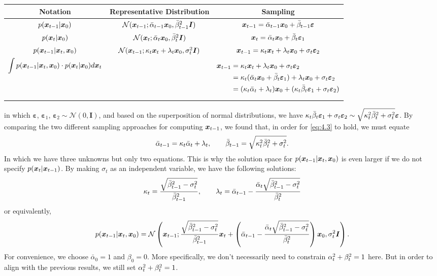 \begin{table*}[h]
    \centering
    \begin{tabular}{c|c|c}
    \hline
      Notation    & Representative Distribution &  Sampling\\
    \hline
     $p(\bm{x}_{t-1}|\bm{x}_0)$  &  $\mathcal{N}(\bm{x}_{t-1};\bar{\alpha}_{t-1}\bm{x}_0,\bar{\beta}_{t-1}^2\bm{I})$ & $\bm{x}_{t-1}=\bar{\alpha}_{t-1} \bm{x}_0+\bar{\beta}_{t-1} \bm{\varepsilon}$ \\
     \hline
     $p(\bm{x}_{t}|\bm{x}_0)$  & $\mathcal{N}(\bm{x}_{t};\bar{\alpha}_t\bm{x}_0,\bar{\beta}_t^2\bm{I})$  & $\bm{x}_{t}=\bar{\alpha}_t\bm{x}_0+\bar{\beta}_t\bm{\varepsilon}_1$\\
     \hline
     $p(\bm{x}_{t-1}|\bm{x}_{t},\bm{x}_0)$ &  $\mathcal{N}(\bm{x}_{t-1};\kappa_t\bm{x}_{t}+\lambda_t \bm{x}_0,\sigma_t^2\bm{I})$ & $\bm{x}_{t-1}=\kappa_t\bm{x}_{t}+\lambda_t\bm{x}_0+\sigma_t\bm{\varepsilon}_2$ \\
     \hline
     $\displaystyle{\int p(\bm{x}_{t-1}|\bm{x}_{t},\bm{x}_0)}\cdot p(\bm{x}_{t}|\bm{x}_0)d\bm{x}_{t} $ &   &   \parbox{6cm}{\begin{align*}
    \bm{x}_{t-1} &= \kappa_t\bm{x}_{t} +\lambda_t\bm{x}_0+\sigma_t\bm{\varepsilon}_2\\
     &= \kappa_t (\bar{\alpha}_t\bm{x}_0 +\bar{\beta}_t\bm{\varepsilon}_1) + \lambda_t\bm{x}_0+\sigma_t\bm{\varepsilon}_2\\
     &= (\kappa_t\bar{\alpha}_t+\lambda_t)\bm{x}_0+(\kappa_t\bar{\beta}_t\bm{\varepsilon}_1+\sigma_t\bm{\varepsilon}_2)
  \end{align*}} \\
    \hline
    \end{tabular}
\end{table*}
in which $\bm{\varepsilon}$, $\bm{\varepsilon}_1$, $\bm{\varepsilon}_2\sim\mathcal{N}(0,\bm{I})$, and based on the superposition of normal distributions, we have $\kappa_t\bar{\beta}_t\bm{\varepsilon}_1+\sigma_t\bm{\varepsilon}_2\sim \sqrt{\kappa_t^2\bar{\beta}_t^2+\sigma_t^2}\bm{\varepsilon}$. By comparing the two different sampling approaches for computing $\bm{x}_{t-1}$, we found that, in order for \cref{eq:4.3} to hold, we must equate
\begin{equation}
\label{eq:4.5}
    \bar{\alpha}_{t-1}=\kappa_t\bar{\alpha}_t+\lambda_t, \qquad \bar{\beta}_{t-1}=\sqrt{\kappa_t^2\bar{\beta}_t^2+\sigma_t^2}.
\end{equation}
In which we have three unknowns but only two equations. This is why the solution space for $p(\bm{x}_{t-1}|\bm{x}_{t},\bm{x}_0)$ is even larger if we do not specify $p(\bm{x}_{t}|\bm{x}_{t-1})$. By making $\sigma_t$ as an independent variable, we have the following solutions:
\begin{equation}
    \label{eq:4.6}
    \kappa_t=\frac{\sqrt{\bar{\beta}_{t-1}^2-\sigma_t^2}}{\bar{\beta}_{t-1}^2},\qquad \lambda_t=\bar{\alpha}_{t-1}-\frac{\bar{\alpha}_t\sqrt{\bar{\beta}_{t-1}^2-\sigma_t^2}}{\bar{\beta}_t^2}
\end{equation}
or equivalently,
\begin{equation}
    \label{eq:4.7}
    p(\bm{x}_{t-1}|\bm{x}_{t},\bm{x}_0)=\mathcal{N}\left(\bm{x}_{t-1};\frac{\sqrt{\bar{\beta}_{t-1}^2-\sigma_t^2}}{\bar{\beta}_{t-1}^2}\bm{x}_{t}+\left(\bar{\alpha}_{t-1}-\frac{\bar{\alpha}_t\sqrt{\bar{\beta}_{t-1}^2-\sigma_t^2}}{\bar{\beta}_t^2} \right) \bm{x}_0, \sigma_t^2\bm{I} \right).
\end{equation}
For convenience, we choose $\bar{\alpha}_0=1$ and $\beta_0=0$. More specifically, we don't necessarily need to constrain $\alpha_t^2+\beta_t^2=1$ here. But in order to align with the previous results, we still set $\alpha_t^2+\beta_t^2=1$.

